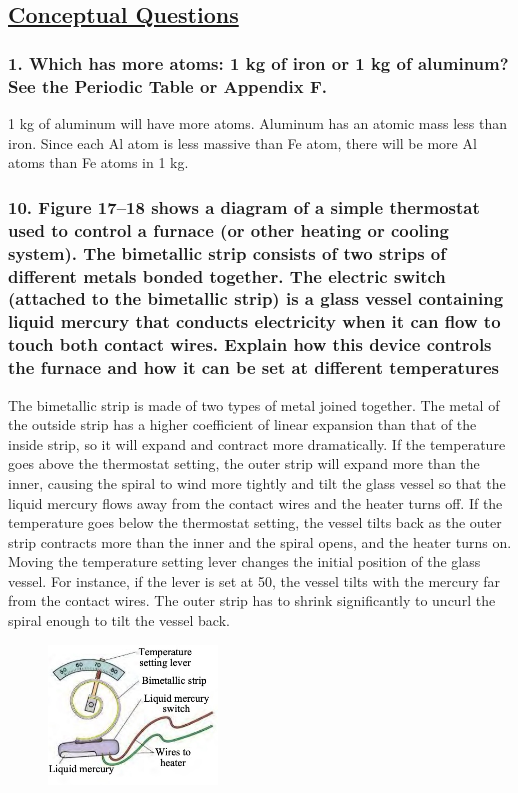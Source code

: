 \documentclass{article}
\title{
    \vspace{2in}
    \textmd{\textbf{\hmwkTitle}}\\
    \vspace{0.5in}
    \textmd{\textbf{\hmwkClass}}\\
    \vspace{4in}
}
\author{\hmwkAuthorName}
\date{}
\begin{document}
\maketitle
\newpage
\begin{center}
    \section*{\textbf{\underline {Conceptual Questions}}}
\end{center}
\subsubsection*{
    1. Which has more atoms: 1 kg of iron or 1 kg of aluminum?
    See the Periodic Table or Appendix F. 
}
1 kg of aluminum will have more atoms. Aluminum has an atomic mass less than
iron. Since each Al atom is less massive than Fe atom, there will be more Al
atoms than Fe atoms in 1 kg.
\subsubsection*{
    10. Figure 17–18 shows a diagram of a simple \textbf{thermostat} used
    to control a furnace (or other heating or cooling system). The
    bimetallic strip consists of two strips of different metals bonded
    together. The electric switch (attached to the bimetallic strip) is
    a glass vessel containing liquid mercury that conducts electricity 
    when it can flow to touch both contact wires. Explain how this device
    controls the furnace and how it can be set at different temperatures
}
The bimetallic strip is made of two types of metal joined together. The metal of
the outside strip has a higher coefficient of linear expansion than that of the
inside strip, so it will expand and contract more dramatically. If
the temperature goes above the thermostat setting, the outer strip will expand
more than the inner, causing the spiral to wind more tightly and tilt the glass
vessel so that the liquid mercury flows away from the contact wires and the
heater turns off. If the temperature goes below the thermostat setting, the
vessel tilts back as the outer strip contracts more than the inner and the
spiral opens, and the heater turns on. Moving the temperature setting lever
changes the initial position of the glass vessel. For instance, if the lever is
set at 50, the vessel tilts with the mercury far from the contact wires. The
outer strip has to shrink significantly to uncurl the spiral enough to tilt the
vessel back.
\begin{figure}[h]
    \begin{center}
        \includegraphics[width=0.4\textwidth]{figures/q10.jpg}
    \end{center}
\end{figure}
\end{document}
